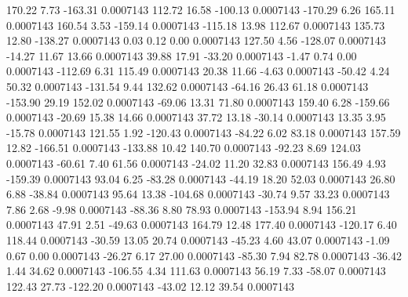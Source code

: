       170.22        7.73     -163.31     0.0007143
      112.72       16.58     -100.13     0.0007143
     -170.29        6.26      165.11     0.0007143
      160.54        3.53     -159.14     0.0007143
     -115.18       13.98      112.67     0.0007143
      135.73       12.80     -138.27     0.0007143
        0.03        0.12        0.00     0.0007143
      127.50        4.56     -128.07     0.0007143
      -14.27       11.67       13.66     0.0007143
       39.88       17.91      -33.20     0.0007143
       -1.47        0.74        0.00     0.0007143
     -112.69        6.31      115.49     0.0007143
       20.38       11.66       -4.63     0.0007143
      -50.42        4.24       50.32     0.0007143
     -131.54        9.44      132.62     0.0007143
      -64.16       26.43       61.18     0.0007143
     -153.90       29.19      152.02     0.0007143
      -69.06       13.31       71.80     0.0007143
      159.40        6.28     -159.66     0.0007143
      -20.69       15.38       14.66     0.0007143
       37.72       13.18      -30.14     0.0007143
       13.35        3.95      -15.78     0.0007143
      121.55        1.92     -120.43     0.0007143
      -84.22        6.02       83.18     0.0007143
      157.59       12.82     -166.51     0.0007143
     -133.88       10.42      140.70     0.0007143
      -92.23        8.69      124.03     0.0007143
      -60.61        7.40       61.56     0.0007143
      -24.02       11.20       32.83     0.0007143
      156.49        4.93     -159.39     0.0007143
       93.04        6.25      -83.28     0.0007143
      -44.19       18.20       52.03     0.0007143
       26.80        6.88      -38.84     0.0007143
       95.64       13.38     -104.68     0.0007143
      -30.74        9.57       33.23     0.0007143
        7.86        2.68       -9.98     0.0007143
      -88.36        8.80       78.93     0.0007143
     -153.94        8.94      156.21     0.0007143
       47.91        2.51      -49.63     0.0007143
      164.79       12.48      177.40     0.0007143
     -120.17        6.40      118.44     0.0007143
      -30.59       13.05       20.74     0.0007143
      -45.23        4.60       43.07     0.0007143
       -1.09        0.67        0.00     0.0007143
      -26.27        6.17       27.00     0.0007143
      -85.30        7.94       82.78     0.0007143
      -36.42        1.44       34.62     0.0007143
     -106.55        4.34      111.63     0.0007143
       56.19        7.33      -58.07     0.0007143
      122.43       27.73     -122.20     0.0007143
      -43.02       12.12       39.54     0.0007143
